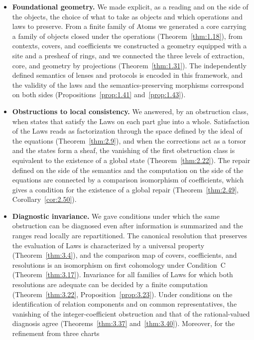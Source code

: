 \begin{itemize}
\item \textbf{Foundational geometry.} We made explicit, as a reading and on the side of the objects, the choice of what to
take as objects and which operations and laws to preserve.
From a finite family of Atoms we generated a core carrying a family of objects closed under
the operations (Theorem~\ref{thm:1.18}), from contexts, covers, and coefficients we
constructed a geometry equipped with a site and a presheaf of rings, and we connected the
three levels of extraction, core, and geometry by projections (Theorem~\ref{thm:1.31}). The
independently defined semantics of lenses and protocols is encoded in this framework, and
the validity of the laws and the semantics-preserving morphisms correspond on both sides
(Propositions~\ref{prop:1.41} and~\ref{prop:1.43}).
\item \textbf{Obstructions to local consistency.} We answered, by an obstruction class, when
states that satisfy the Laws on each part glue into a whole. Satisfaction of the Laws reads
as factorization through the space defined by the ideal of the equations
(Theorem~\ref{thm:2.9}), and when the corrections act as a torsor and the states form a
sheaf, the vanishing of the first obstruction class is equivalent to the existence of a
global state (Theorem~\ref{thm:2.22}). The repair defined on the side of the semantics and
the computation on the side of the equations are connected by a comparison isomorphism of
coefficients, which gives a condition for the existence of a global repair
(Theorem~\ref{thm:2.49}, Corollary~\ref{cor:2.50}).
\item \textbf{Diagnostic invariance.} We gave conditions under which the same obstruction
can be diagnosed even after information is summarized and the ranges read locally are
repartitioned. The canonical resolution that preserves the evaluation of Laws is
characterized by a universal property (Theorem~\ref{thm:3.4}), and the comparison map of
covers, coefficients, and resolutions is an isomorphism on first cohomology under
Condition~C (Theorem~\ref{thm:3.17}). Invariance for all families of Laws for which both
resolutions are adequate can be decided by a finite computation (Theorem~\ref{thm:3.22},
Proposition~\ref{prop:3.23}). Under conditions on the identification of relation components
and on common representatives, the vanishing of the integer-coefficient obstruction and that
of the rational-valued diagnosis agree
(Theorems~\ref{thm:3.37} and~\ref{thm:3.40}). Moreover, for the refinement from three charts

\end{itemize}
